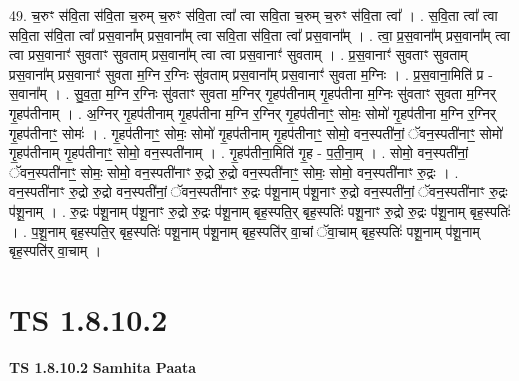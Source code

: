 \documentclass[17pt]{extarticle}
\begin{document}
49. च॒रुꣳ स॑वि॒ता स॑वि॒ता च॒रुम् च॒रुꣳ स॑वि॒ता त्वा᳚ त्वा सवि॒ता च॒रुम् च॒रुꣳ स॑वि॒ता त्वा᳚ । . स॒वि॒ता त्वा᳚ त्वा सवि॒ता स॑वि॒ता त्वा᳚ प्रस॒वाना᳚म् प्रस॒वाना᳚म् त्वा सवि॒ता स॑वि॒ता त्वा᳚ प्रस॒वाना᳚म् । . त्वा॒ प्र॒स॒वाना᳚म् प्रस॒वाना᳚म् त्वा त्वा प्रस॒वानाꣳ॑ सुवताꣳ सुवताम् प्रस॒वाना᳚म् त्वा त्वा प्रस॒वानाꣳ॑ सुवताम् । . प्र॒स॒वानाꣳ॑ सुवताꣳ सुवताम् प्रस॒वाना᳚म् प्रस॒वानाꣳ॑ सुवता म॒ग्नि र॒ग्निः सु॑वताम् प्रस॒वाना᳚म् प्रस॒वानाꣳ॑ सुवता म॒ग्निः । . प्र॒स॒वाना॒मिति॑ प्र - स॒वाना᳚म् । . सु॒व॒ता॒ म॒ग्नि र॒ग्निः सु॑वताꣳ सुवता म॒ग्निर् गृ॒हप॑तीनाम् गृ॒हप॑तीना म॒ग्निः सु॑वताꣳ सुवता म॒ग्निर् गृ॒हप॑तीनाम् । . अ॒ग्निर् गृ॒हप॑तीनाम् गृ॒हप॑तीना म॒ग्नि र॒ग्निर् गृ॒हप॑तीनाꣳ॒॒ सोमः॒ सोमो॑ गृ॒हप॑तीना म॒ग्नि र॒ग्निर् गृ॒हप॑तीनाꣳ॒॒ सोमः॑ । . गृ॒हप॑तीनाꣳ॒॒ सोमः॒ सोमो॑ गृ॒हप॑तीनाम् गृ॒हप॑तीनाꣳ॒॒ सोमो॒ वन॒स्पती॑नां॒ ॅवन॒स्पती॑नाꣳ॒॒ सोमो॑ गृ॒हप॑तीनाम् गृ॒हप॑तीनाꣳ॒॒ सोमो॒ वन॒स्पती॑नाम् । . गृ॒हप॑तीना॒मिति॑ गृ॒ह - प॒ती॒ना॒म् । . सोमो॒ वन॒स्पती॑नां॒ ॅवन॒स्पती॑नाꣳ॒॒ सोमः॒ सोमो॒ वन॒स्पती॑नाꣳ रु॒द्रो रु॒द्रो वन॒स्पती॑नाꣳ॒॒ सोमः॒ सोमो॒ वन॒स्पती॑नाꣳ रु॒द्रः । . वन॒स्पती॑नाꣳ रु॒द्रो रु॒द्रो वन॒स्पती॑नां॒ ॅवन॒स्पती॑नाꣳ रु॒द्रः प॑शू॒नाम् प॑शू॒नाꣳ रु॒द्रो वन॒स्पती॑नां॒ ॅवन॒स्पती॑नाꣳ रु॒द्रः प॑शू॒नाम् । . रु॒द्रः प॑शू॒नाम् प॑शू॒नाꣳ रु॒द्रो रु॒द्रः प॑शू॒नाम् बृह॒स्पति॒र् बृह॒स्पतिः॑ पशू॒नाꣳ रु॒द्रो रु॒द्रः प॑शू॒नाम् बृह॒स्पतिः॑ । . प॒शू॒नाम् बृह॒स्पति॒र् बृह॒स्पतिः॑ पशू॒नाम् प॑शू॒नाम् बृह॒स्पति॑र् वा॒चां ॅवा॒चाम् बृह॒स्पतिः॑ पशू॒नाम् प॑शू॒नाम् बृह॒स्पति॑र् वा॒चाम् । \newline
\pagebreak
{}

\section{ TS 1.8.10.2 }

\textbf{TS 1.8.10.2 } \newline
\textbf{Samhita Paata} \newline
\end{document}
